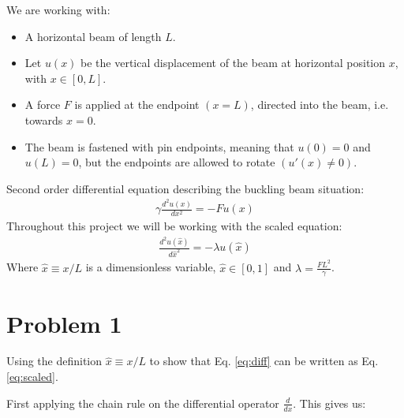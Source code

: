 \documentclass[english,notitlepage]{revtex4-1}  %
\begin{document}
We are working with:
\begin{itemize}
    \item A horizontal beam of length $L$.

    \item Let $u(x)$ be the vertical displacement of the beam at horizontal position $x$, with $x \in [0,L]$.

    \item A force $F$ is applied at the endpoint $(x = L)$, directed into the beam, i.e. towards $x = 0$.

    \item The beam is fastened with pin endpoints, meaning that $u(0) = 0$ and $u(L) = 0$, but the endpoints are allowed to rotate $(u'(x) \neq 0)$.
\end{itemize}
Second order differential equation describing the buckling beam situation:
\begin{align}
    \gamma \frac{d^2u(x)}{dx^2} = - F u(x)
    \label{eq:diff}
\end{align}
Throughout this project we will be working with the scaled equation:
\begin{align}
    \frac{d^2u(\hat{x})}{d \hat{x}^2} = - \lambda u(\hat{x})
    \label{eq:scaled}
\end{align}
Where $\hat{x} \equiv x / L$ is a dimensionless variable, $\hat{x} \in [0,1]$ and $\lambda = \frac{FL^2}{\gamma}$.

\section*{Problem 1}
Using the definition $\hat{x} \equiv x / L$ to show that Eq. \ref*{eq:diff} can be written as Eq. \ref*{eq:scaled}.

First applying the chain rule on the differential operator $\frac{d}{dx}$. This gives us:
\end{document}
